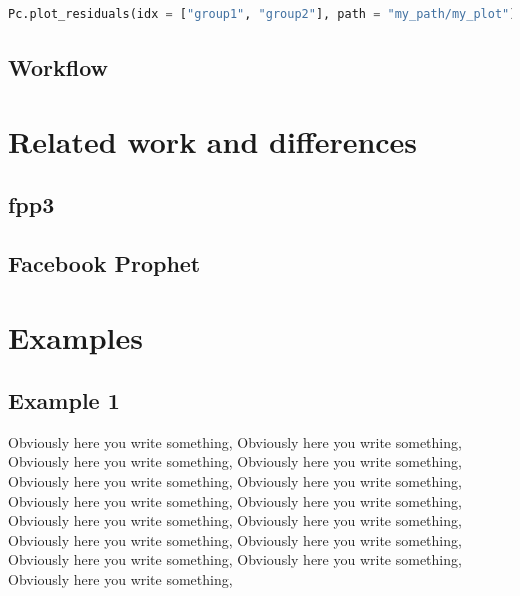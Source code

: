 \documentclass{article}
\begin{document}
\begin{lstlisting}[language=Python]
        Pc.plot_residuals(idx = ["group1", "group2"], path = "my_path/my_plot")
\end{lstlisting}

\subsection{Workflow}

\section{Related work and differences}

\subsection{fpp3}

\subsection{Facebook Prophet}

\section{Examples}

\subsection{Example 1}

Obviously here you write something, Obviously here you write something, Obviously here you write something, Obviously here you write something, Obviously here you write something, Obviously here you write something, Obviously here you write something, Obviously here you write something, Obviously here you write something, Obviously here you write something, Obviously here you write something, Obviously here you write something, Obviously here you write something, Obviously here you write something, Obviously here you write something, 
\end{document}

